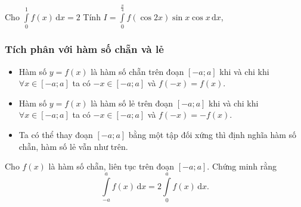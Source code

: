 \begin{ex}%
	Cho $\displaystyle\int\limits_0^1 f(x)\mathrm{\,d}x=2$ Tính $I=\displaystyle\int\limits_0^{\tfrac{\pi}{4}} f(\cos 2x)\sin x\cos x\mathrm{\,d}x$,
\end{ex}
\subsubsection{Tích phân với hàm số chẵn và lẻ}
\begin{itemize}
	\item Hàm số $y=f(x)$ là hàm số chẵn trên đoạn $[-a;a]$ khi và chi khi $\forall x\in[-a;a]$ ta có $-x\in[-a;a]$ và $f(-x)=f(x)$.
	\item Hàm số $y=f(x)$ là hàm số lẻ trên đoạn $[-a;a]$ khi và chi khi $\forall x\in[-a;a]$ ta có $-x\in[-a;a]$ và $f(-x)=-f(x)$.
	\item Ta có thể thay đoạn $[-a;a]$ bằng một tập đối xứng thì định nghĩa hàm số chẵn, hàm số lẻ vẫn như trên.
\end{itemize}
\begin{ex}%
	Cho $f(x)$ là hàm số chẵn, liên tục trên đoạn $[-a;a]$. Chứng minh rằng \[\displaystyle\int\limits_{-a}^a f(x)\mathrm{\,d}x=2\displaystyle\int\limits_0^a f(x)\mathrm{\,d}x.\]
\end{ex}
